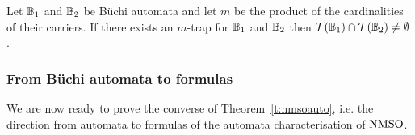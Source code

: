 
\begin{proposition}\label{PROP_Rabin_trap}
Let $\mathbb{B}_1$ and $\mathbb{B}_2$ be B\"{u}chi automata and let $m$ be the
product of the cardinalities of their carriers.
If there exists an $m$-trap for $\mathbb{B}_1$ and $\mathbb{B}_2$ then
$\mathcal{T}(\mathbb{B}_1) \cap \mathcal{T}(\mathbb{B}_2) \neq \emptyset$.
\end{proposition}


\subsubsection{From B\"{u}chi automata to formulas}
We are now ready to prove the converse of Theorem~\ref{t:nmsoauto}, i.e. the direction from automata to formulas of the automata characterisation of $\mathrm{NMSO}$.

